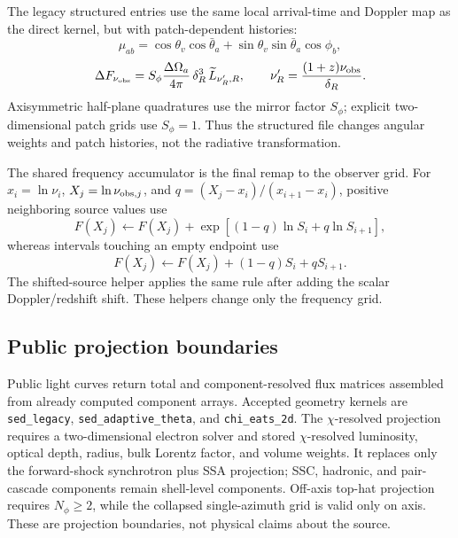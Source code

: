 \documentclass[twocolumn]{aastex702}
\begin{document}
The legacy structured entries use the same local arrival-time and Doppler map as
the direct kernel, but with patch-dependent histories:
\begin{equation}
\mu_{ab}=\cos\theta_v\cos\bar\theta_a
+\sin\theta_v\sin\bar\theta_a\cos\phi_b,
\end{equation}
\begin{equation}
\Delta F_{\nu_{\rm obs}}=
S_\phi\frac{\Delta\Omega_a}{4\pi}\,
\delta_R^3\,\widetilde L_{\nu'_R,R},
\qquad
\nu'_R=\frac{(1+z)\nu_{\rm obs}}{\delta_R}.
\end{equation}
Axisymmetric half-plane quadratures use the mirror factor \(S_\phi\); explicit
two-dimensional patch grids use \(S_\phi=1\).  Thus the structured file changes
angular weights and patch histories, not the radiative transformation.

The shared frequency accumulator is the final remap to the observer grid.  For
\(x_i=\ln\nu_i\), \(X_j=\ln\nu_{{\rm obs},j}\), and
\(q=(X_j-x_i)/(x_{i+1}-x_i)\), positive neighboring source values use
\begin{equation}
F(X_j)\leftarrow F(X_j)+
\exp[(1-q)\ln S_i+q\ln S_{i+1}],
\end{equation}
whereas intervals touching an empty endpoint use
\begin{equation}
F(X_j)\leftarrow F(X_j)+(1-q)S_i+qS_{i+1}.
\end{equation}
The shifted-source helper applies the same rule after adding the scalar
Doppler/redshift shift.  These helpers change only the frequency grid.

\subsection{Public projection boundaries}

Public light curves return total and component-resolved flux matrices assembled
from already computed component arrays.  Accepted geometry kernels are
\texttt{sed\_legacy}, \texttt{sed\_adaptive\_theta}, and
\texttt{chi\_eats\_2d}.  The \(\chi\)-resolved projection requires a
two-dimensional electron solver and stored \(\chi\)-resolved luminosity, optical
depth, radius, bulk Lorentz factor, and volume weights.  It replaces only the
forward-shock synchrotron plus SSA projection; SSC, hadronic, and pair-cascade
components remain shell-level components.  Off-axis top-hat projection requires
\(N_\phi\ge2\), while the collapsed single-azimuth grid is valid only on axis.
These are projection boundaries, not physical claims about the source.
\end{document}
